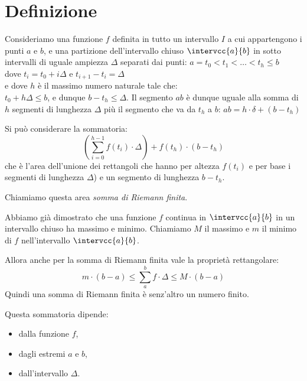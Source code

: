 \section{Definizione}
\label{sec:integrali_definizione}

\begin{minipage}{.49\textwidth} 
Consideriamo una funzione \(f\) definita in tutto un intervallo \(I\) a cui 
appartengono i punti \(a\) e \(b\), e una partizione dell'intervallo chiuso 
\(\intervcc{a}{b}\) in sotto intervalli di uguale ampiezza \(\Delta\) 
separati dai punti: 
\(a = t_0 < t_1 < \dots < t_h \le b\) \\
dove \(t_i = t_0 +i \Delta\) \quad e \quad \(t_{i+1} - t_i= \Delta\) \\
e dove \(h\) è il massimo numero naturale tale che: \\
\(t_0 + h \Delta \le b\), e dunque \(b-t_h \le \Delta\). 
Il segmento \(ab\) è dunque uguale alla somma di \(h\) segmenti di lunghezza 
\(\Delta\) più il segmento che va da \(t_h\) a \(b\):
\(ab = h \cdot \delta + (b - t_h)\)
\end{minipage}
\hfill
\begin{minipage}{.49\textwidth}
\begin{inaccessibleblock} 
  \sommariemann
\end{inaccessibleblock}
\end{minipage}

Si può considerare la sommatoria:
\[\left(\sum_{i=0}^{h-1} f(t_i)\cdot\Delta \right)+f(t_h)\cdot(b-t_h)\] 
che è l'area dell'unione dei rettangoli che 
hanno per altezza \(f(t_i)\) 
e per base i segmenti di lunghezza \(\Delta\)) e un segmento di lunghezza \(b 
- t_{h}\). 

Chiamiamo questa area \emph{somma di Riemann finita}.

Abbiamo già dimostrato che una funzione \(f\) continua in 
\(\intervcc{a}{b}\) in un intervallo chiuso ha massimo e minimo. 
Chiamiamo \(M\) il massimo e \(m\) il minimo di \(f\) nell'intervallo 
\(\intervcc{a}{b}\).

Allora anche per la somma di Riemann finita vale la proprietà rettangolare: 
\[m\cdot(b - a) \le \sum_a^b f \cdot\Delta \le M\cdot(b - a)\] 
Quindi una somma di Riemann finita è senz'altro un numero finito.

Questa sommatoria dipende:
\begin{itemize} [nosep]
 \item dalla funzione \(f\),
 \item dagli estremi \(a\) e \(b\),
 \item dall'intervallo \(\Delta\).
\end{itemize}

